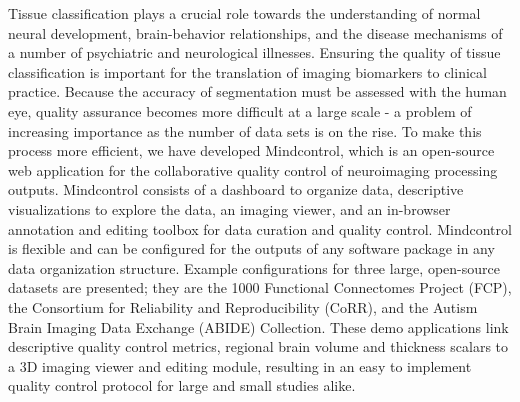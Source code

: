 Tissue classification plays a crucial role towards the understanding of normal neural development, brain-behavior relationships, and the disease mechanisms of a number of psychiatric and neurological illnesses. Ensuring the quality of tissue classification is important for the translation of imaging biomarkers to clinical practice. Because the accuracy of segmentation must be assessed with the human eye, quality assurance becomes more difficult at a large scale - a problem of increasing importance as the number of data sets is on the rise. To make this process more efficient, we have developed Mindcontrol, which is an open-source web application for the collaborative quality control of neuroimaging processing outputs. Mindcontrol consists of a dashboard to organize data, descriptive visualizations to explore the data, an imaging viewer, and an in-browser annotation and editing toolbox for data curation and quality control. Mindcontrol is flexible and can be configured for the outputs of any software package in any data organization structure. Example configurations for three large, open-source datasets are presented; they are the 1000 Functional Connectomes Project (FCP), the Consortium for Reliability and Reproducibility (CoRR), and the Autism Brain Imaging Data Exchange (ABIDE) Collection. These demo applications link descriptive quality control metrics, regional brain volume and thickness scalars to a 3D imaging viewer and editing module, resulting in an easy to implement quality control protocol for large and small studies alike.